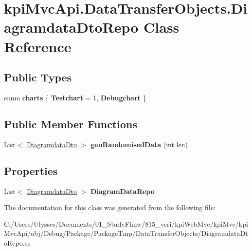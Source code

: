 \hypertarget{classkpi_mvc_api_1_1_data_transfer_objects_1_1_diagramdata_dto_repo}{}\section{kpi\+Mvc\+Api.\+Data\+Transfer\+Objects.\+Diagramdata\+Dto\+Repo Class Reference}
\label{classkpi_mvc_api_1_1_data_transfer_objects_1_1_diagramdata_dto_repo}
\subsection*{Public Types}
\begin{DoxyCompactItemize}
\item 
\mbox{\label{classkpi_mvc_api_1_1_data_transfer_objects_1_1_diagramdata_dto_repo_a58bbabee43b0cec73f86ae00072a5ba6}} 
enum {\bfseries charts} \{ {\bfseries Testchart} = 1, 
{\bfseries Debugchart}
 \}
\end{DoxyCompactItemize}
\subsection*{Public Member Functions}
\begin{DoxyCompactItemize}
\item 
\mbox{\label{classkpi_mvc_api_1_1_data_transfer_objects_1_1_diagramdata_dto_repo_a20acbfa7c0cc330f40ea80fae3a8ba87}} 
List$<$ \hyperlink{classkpi_mvc_api_1_1_data_transfer_objects_1_1_diagramdata_dto}{Diagramdata\+Dto} $>$ {\bfseries gen\+Randomised\+Data} (int len)
\end{DoxyCompactItemize}
\subsection*{Properties}
\begin{DoxyCompactItemize}
\item 
\mbox{\label{classkpi_mvc_api_1_1_data_transfer_objects_1_1_diagramdata_dto_repo_a832e84f15dc1ff02134038bf8325306d}} 
List$<$ \hyperlink{classkpi_mvc_api_1_1_data_transfer_objects_1_1_diagramdata_dto}{Diagramdata\+Dto} $>$ {\bfseries Diagram\+Data\+Repo}
\end{DoxyCompactItemize}


The documentation for this class was generated from the following file\+:\begin{DoxyCompactItemize}
\item 
C\+:/\+Users/\+Ulysses/\+Documents/01\+\_\+\+Study\+Fhnw/815\+\_\+veri/kpi\+Web\+Mvc/kpi\+Mvc/kpi\+Mvc\+Api/obj/\+Debug/\+Package/\+Package\+Tmp/\+Data\+Transfer\+Objects/Diagramdata\+Dto\+Repo.\+cs\end{DoxyCompactItemize}
